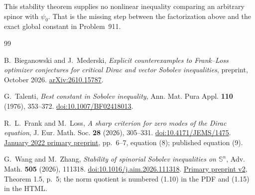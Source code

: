 \documentclass[11pt,a4paper]{article}
\theoremstyle{remark}
\begin{document}
This stability theorem supplies no nonlinear inequality comparing an
arbitrary spinor with $\psi_0$. That is the missing step between the
factorization above and the exact global constant in Problem~911.


\begin{thebibliography}{99}
\small
\setlength{\itemsep}{3pt}

B.~Bieganowski and J.~Mederski,
\emph{Explicit counterexamples to Frank--Loss optimizer conjectures for
critical Dirac and vector Sobolev inequalities}, preprint, October 2026.
\href{https://arxiv.org/abs/2610.15787}{arXiv:2610.15787}.

G.~Talenti,
\emph{Best constant in Sobolev inequality},
Ann. Mat. Pura Appl. \textbf{110} (1976), 353--372.
\href{https://doi.org/10.1007/BF02418013}{doi:10.1007/BF02418013}.

R.~L.~Frank and M.~Loss,
\emph{A sharp criterion for zero modes of the Dirac equation},
J. Eur. Math. Soc. \textbf{28} (2026), 305--331.
\href{https://doi.org/10.4171/JEMS/1475}{doi:10.4171/JEMS/1475}.
\href{https://arxiv.org/abs/2201.03610v1}{January 2022 primary preprint},
pp.~6--7, equation (8); published equation (9).

G.~Wang and M.~Zhang,
\emph{Stability of spinorial Sobolev inequalities on $\mathbb S^n$},
Adv. Math. \textbf{505} (2026), 111318.
\href{https://doi.org/10.1016/j.aim.2026.111318}{doi:10.1016/j.aim.2026.111318}.
\href{https://arxiv.org/abs/2508.09047v2}{Primary preprint v2},
Theorem 1.5, p.~5; the norm quotient is numbered (1.10) in the PDF
and (1.15) in the HTML.

\end{thebibliography}
\end{document}
